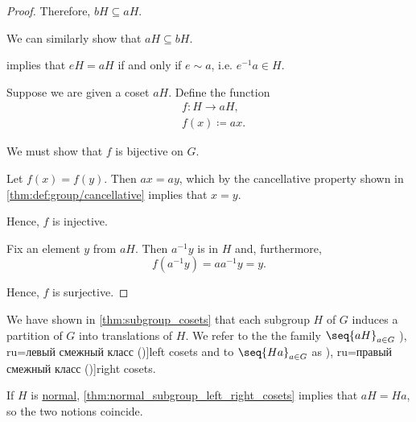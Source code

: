 \begin{proof}
  Therefore, \( b H \subseteq a H \).

  We can similarly show that \( a H \subseteq b H \).

    implies that \( e H = a H \) if and only if \( e \sim a \), i.e. \( e^{-1} a \in H \).

   Suppose we are given a coset \( a H \). Define the function
  \begin{equation*}
    \begin{aligned}
      &f: H \to a H, \\
      &f(x) \coloneqq a x.
    \end{aligned}
  \end{equation*}

  We must show that \( f \) is bijective on \( G \).

   Let \( f(x) = f(y) \). Then \( a x = a y \), which by the cancellative property shown in \cref{thm:def:group/cancellative} implies that \( x = y \).

  Hence, \( f \) is injective.

   Fix an element \( y \) from \( a H \). Then \( a^{-1} y \) is in \( H \) and, furthermore,
  \begin{equation*}
    f(a^{-1} y) = a a^{-1} y = y.
  \end{equation*}

  Hence, \( f \) is surjective.
\end{proof}

\begin{definition}\label{def:subgroup_cosets}
  We have shown in \cref{thm:subgroup_cosets} that each subgroup \( H \) of \( G \) induces a partition of \( G \) into translations of \( H \). We refer to the the family \( \seq{ aH }_{a \in G} \) \term[bg=ляв съседен клас (\cite[91]{ГеновМиховскиМоллов1991Алгебра}), ru=левый смежный класс (\cite[93]{Тыртышников2017ОсновыАлгебры})]{left cosets} and to \( \seq{ Ha }_{a \in G} \) as \term[bg=десен съседен клас (\cite[91]{ГеновМиховскиМоллов1991Алгебра}), ru=правый смежный класс (\cite[93]{Тыртышников2017ОсновыАлгебры})]{right cosets}.

  If \( H \) is \hyperref[def:normal_subgroup]{normal}, \cref{thm:normal_subgroup_left_right_cosets} implies that \( aH = Ha \), so the two notions coincide.
\end{definition}

